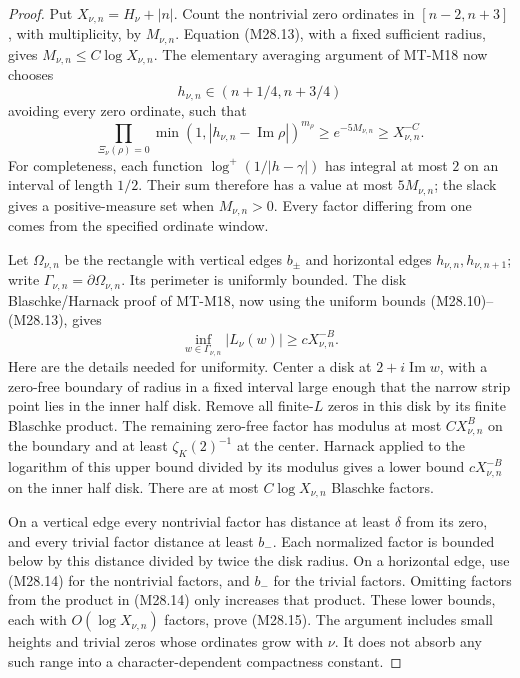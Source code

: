 \begin{proof}
Put \(X_{\nu,n}=H_\nu+|n|\). Count the nontrivial
zero ordinates in \([n-2,n+3]\), with multiplicity,
by \(M_{\nu,n}\). Equation (M28.13), with a fixed
sufficient radius, gives \(M_{\nu,n}\le C\log X_{\nu,n}\).
The elementary averaging argument of MT-M18 now
chooses
\[
        h_{\nu,n}\in(n+1/4,n+3/4)
 \]
avoiding every zero ordinate, such that
\[
 \prod_{\Xi_\nu(\rho)=0}
      \min(1,|h_{\nu,n}-\operatorname{Im}\rho|)^{m_\rho}
           \ge e^{-5M_{\nu,n}}\ge X_{\nu,n}^{-C}.             \tag{M28.14}
\]
For completeness, each function
\(\log^+(1/|h-\gamma|)\) has integral at most \(2\)
on an interval of length \(1/2\). Their sum
therefore has a value at most \(5M_{\nu,n}\);
the slack gives a positive-measure set when
\(M_{\nu,n}>0\). Every factor differing from one
comes from the specified ordinate window.

Let \(\Omega_{\nu,n}\) be the rectangle with
vertical edges \(b_\pm\) and horizontal edges
\(h_{\nu,n},h_{\nu,n+1}\); write
\(\Gamma_{\nu,n}=\partial\Omega_{\nu,n}\).
Its perimeter is uniformly bounded. The disk
Blaschke/Harnack proof of MT-M18, now using the
uniform bounds (M28.10)--(M28.13), gives
\[
        \inf_{w\in\Gamma_{\nu,n}}|L_\nu(w)|
                         \ge c X_{\nu,n}^{-B}.               \tag{M28.15}
\]
Here are the details needed for uniformity. Center
a disk at \(2+i\operatorname{Im}w\), with a
zero-free boundary of radius in a fixed interval
large enough that the narrow strip point lies in
the inner half disk. Remove all finite-\(L\)
zeros in this disk by its finite Blaschke product.
The remaining zero-free factor has modulus at
most \(C X_{\nu,n}^B\) on the boundary and at least
\(\zeta_K(2)^{-1}\) at the center. Harnack applied
to the logarithm of this upper bound divided by
its modulus gives a lower bound \(cX_{\nu,n}^{-B}\)
on the inner half disk. There are at most
\(C\log X_{\nu,n}\) Blaschke factors.

On a vertical edge every nontrivial factor has
distance at least \(\delta\) from its zero, and
every trivial factor distance at least \(b_-\).
Each normalized factor is bounded below by this
distance divided by twice the disk radius.
On a horizontal edge, use (M28.14) for the
nontrivial factors, and \(b_-\) for the trivial
factors. Omitting factors from the product in
(M28.14) only increases that product.
These lower bounds, each with \(O(\log X_{\nu,n})\)
factors, prove (M28.15).
The argument includes small heights and trivial
zeros whose ordinates grow with \(\nu\). It
does not absorb any such range into a
character-dependent compactness constant.


\end{proof}
